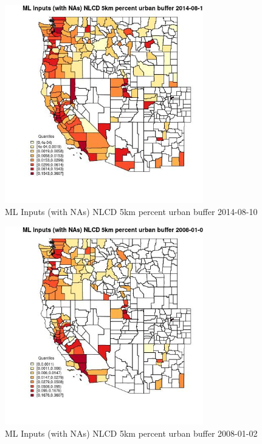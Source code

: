 \begin{figure} 
\centering  
\includegraphics[width=0.77\textwidth]{Code_Outputs/Report_ML_input_PM25_Step4_part_e_de_duplicated_aves_compiled_2019-05-18wNAs_CountyNLCD_5km_percent_urban_bufferMean2014-08-10_2014-08-10.jpg} 
\caption{\label{fig:Report_ML_input_PM25_Step4_part_e_de_duplicated_aves_compiled_2019-05-18wNAsCountyNLCD_5km_percent_urban_bufferMean2014-08-10_2014-08-10}ML Inputs (with NAs) NLCD 5km percent urban buffer 2014-08-10} 
\end{figure} 
 

\clearpage 

\begin{figure} 
\centering  
\includegraphics[width=0.77\textwidth]{Code_Outputs/Report_ML_input_PM25_Step4_part_e_de_duplicated_aves_compiled_2019-05-18wNAs_CountyNLCD_5km_percent_urban_bufferMean2008-01-02_2008-01-02.jpg} 
\caption{\label{fig:Report_ML_input_PM25_Step4_part_e_de_duplicated_aves_compiled_2019-05-18wNAsCountyNLCD_5km_percent_urban_bufferMean2008-01-02_2008-01-02}ML Inputs (with NAs) NLCD 5km percent urban buffer 2008-01-02} 
\end{figure} 
 

